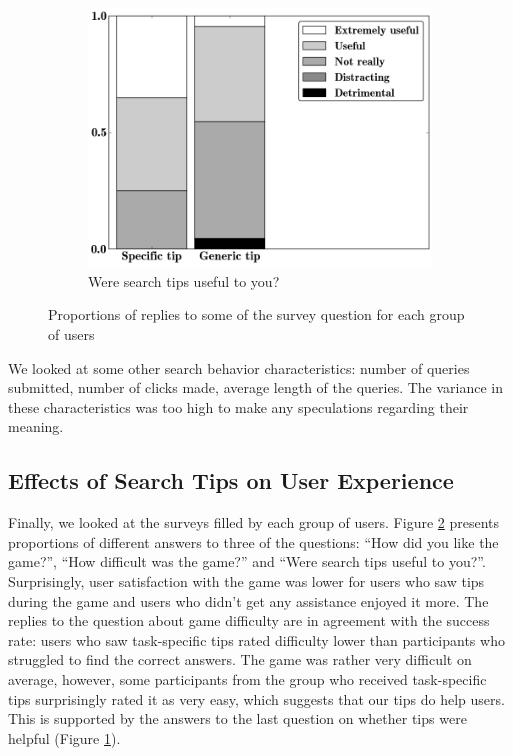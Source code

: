 \documentclass{sig-alternate}
\begin{document}
\begin{figure}[ht]
\begin{subfigure}[t]{0.3\textwidth}
	\includegraphics[scale=0.26]{img/useful}
	\caption{Were search tips useful to you?}
    \label{figure:survey:useful}
\end{subfigure}
\vspace{-2mm}
\caption{Proportions of replies to some of the survey question for each group of users}
\label{figure:survey}
\vspace{-3mm}
\end{figure}

\vspace{-3mm}
We looked at some other search behavior characteristics: number of queries submitted, number of clicks made, average length of the queries. The variance in these characteristics was too high to make any speculations regarding their meaning.

\subsection{Effects of Search Tips on User Experience}

Finally, we looked at the surveys filled by each group of users.
Figure \ref{figure:survey} presents proportions of different answers to three of the questions: ``How did you like the game?'', ``How difficult was the game?'' and ``Were search tips useful to you?''.
Surprisingly, user satisfaction with the game was lower for users who saw tips during the game and users who didn't get any assistance enjoyed it more.
The replies to the question about game difficulty are in agreement with the success rate: users who saw task-specific tips rated difficulty lower than participants who struggled to find the correct answers.
The game was rather very difficult on average, however, some participants from the group who received task-specific tips surprisingly rated it as very easy, which suggests that our tips do help users.
This is supported by the answers to the last question on whether tips were helpful (Figure \ref{figure:survey:useful}).
\end{document}
